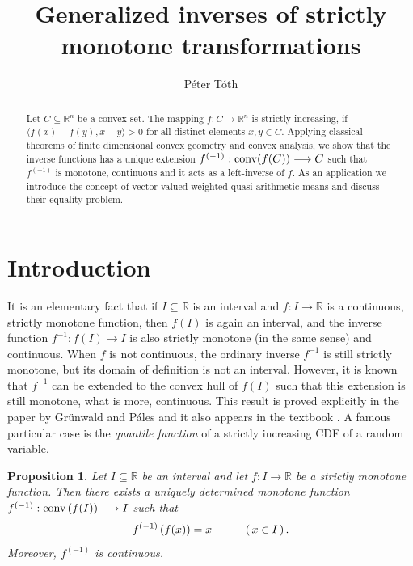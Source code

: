 \documentclass[12pt]{amsart}
\author[P\'eter T\'oth]{P\'eter T\'oth}
\title[Generalized inverses]{Generalized inverses of strictly 
monotone transformations}
\newtheorem{prop}{Proposition}%
\theoremstyle{remark}
\theoremstyle{definition}
\newcommand{\RR}{\mathbb{R}}
\newcommand{\Rn}{\mathbb{R}^n}
\newcommand{\conv}{\mbox{\rm conv}}
\newcommand{\map}{\longrightarrow}
\begin{document}
\begin{abstract} 
Let $ C \subseteq \Rn $ be a convex set. The mapping 
$ f : C \longrightarrow \Rn $ is strictly increasing, if 
$ \langle f(x)-f(y), x-y \rangle > 0 $ 
for all distinct elements 
$ x,y \in C $. Applying classical theorems of 
finite dimensional convex geometry and convex analysis, 
we show that the inverse functions has a 
unique extension 
$ f^{(-1)} : \conv (f(C)) \longrightarrow C $ 
such that $ f^{(-1)} $ is monotone, continuous 
and it acts as a left-inverse of $ f $. 
As an application we introduce the concept of 
vector-valued weighted quasi-arithmetic means and discuss 
their equality problem. 
\end{abstract}

\maketitle


\section{Introduction} 


It is an elementary fact that if $ I \subseteq \RR $ is an 
interval and $ f : I \map \RR $ is a continuous, strictly 
monotone function, then $ f(I) $ is again an interval, and 
the inverse function $ f^{-1} : f(I) \map I $ is also 
strictly monotone (in the same sense) and continuous. 
When $ f $ is not continuous, the ordinary 
inverse $ f^{-1} $ is still strictly monotone, 
but its domain of definition is not an interval. 
However, it is known 
that $ f^{-1} $ can be extended to the convex hull of 
$ f(I) $ such that this extension is still monotone, 
what is more, continuous. This result is proved explicitly 
in the paper \cite{GP20} by Grünwald and Páles and 
it also appears in the textbook \cite{GaPa16}. 
A famous particular case is the 
{\em quantile function} of a strictly increasing CDF 
of a random variable. 

\begin{prop}{\cite[Lemma 1]{GP20}}
Let $ I \subseteq \RR $ be an interval and let 
$ f : I \map \RR $ be a 
strictly monotone function. Then there exists 
a uniquely determined monotone function 
$ f^{(-1)} : \conv \left( f(I) \right) \map I $ 
such that 
\[
f^{(-1)} \left( f(x) \right) = x 
\hspace{10mm} \left( \, x \in I \, \right).  
\]
Moreover, $ f^{(-1)} $ is continuous. 
\end{prop}
\end{document}
